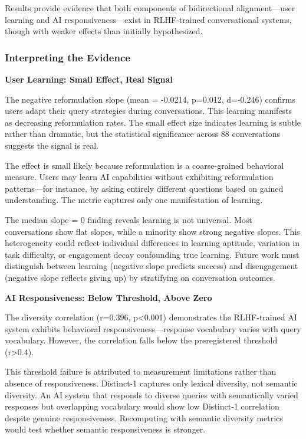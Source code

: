 
Results provide evidence that both components of bidirectional alignment---user learning and AI responsiveness---exist in RLHF-trained conversational systems, though with weaker effects than initially hypothesized.

\subsubsection{Interpreting the Evidence}

\textbf{User Learning: Small Effect, Real Signal}

The negative reformulation slope (mean = -0.0214, p=0.012, d=-0.246) confirms users adapt their query strategies during conversations. This learning manifests as decreasing reformulation rates. The small effect size indicates learning is subtle rather than dramatic, but the statistical significance across 88 conversations suggests the signal is real.

The effect is small likely because reformulation is a coarse-grained behavioral measure. Users may learn AI capabilities without exhibiting reformulation patterns---for instance, by asking entirely different questions based on gained understanding. The metric captures only one manifestation of learning.

The median slope = 0 finding reveals learning is not universal. Most conversations show flat slopes, while a minority show strong negative slopes. This heterogeneity could reflect individual differences in learning aptitude, variation in task difficulty, or engagement decay confounding true learning. Future work must distinguish between learning (negative slope predicts success) and disengagement (negative slope reflects giving up) by stratifying on conversation outcomes.

\textbf{AI Responsiveness: Below Threshold, Above Zero}

The diversity correlation (r=0.396, p<0.001) demonstrates the RLHF-trained AI system exhibits behavioral responsiveness---response vocabulary varies with query vocabulary. However, the correlation falls below the preregistered threshold (r>0.4).

This threshold failure is attributed to measurement limitations rather than absence of responsiveness. Distinct-1 captures only lexical diversity, not semantic diversity. An AI system that responds to diverse queries with semantically varied responses but overlapping vocabulary would show low Distinct-1 correlation despite genuine responsiveness. Recomputing with semantic diversity metrics would test whether semantic responsiveness is stronger.

